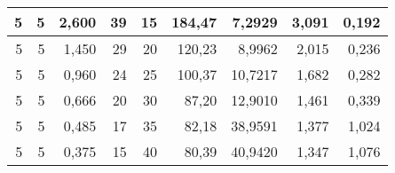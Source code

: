 \begin{tabular}{rrrrrrrrr}
5 & 5 & 2,600 & 39 & 15 & 184,47 & 7,2929 & 3,091 & 0,192 \\ \hline
5 & 5 & 1,450 & 29 & 20 & 120,23 & 8,9962 & 2,015 & 0,236 \\ \hline
5 & 5 & 0,960 & 24 & 25 & 100,37 & 10,7217 & 1,682 & 0,282 \\ \hline
5 & 5 & 0,666 & 20 & 30 & 87,20 & 12,9010 & 1,461 & 0,339 \\ \hline
5 & 5 & 0,485 & 17 & 35 & 82,18 & 38,9591 & 1,377 & 1,024 \\ \hline
5 & 5 & 0,375 & 15 & 40 & 80,39 & 40,9420 & 1,347 & 1,076 \\ \hline
\bottomrule
\end{tabular}
